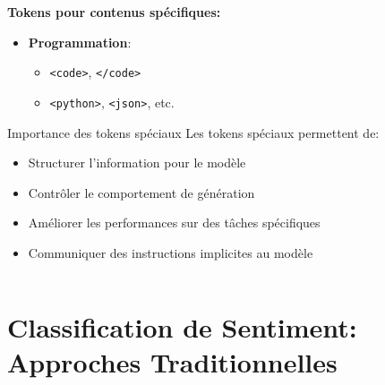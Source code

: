 \documentclass[aspectratio=169,11pt]{beamer}
\begin{document}
\begin{frame}
\begin{columns}[T]
        \begin{column}{0.5\textwidth}
            \textbf{Tokens pour contenus spécifiques:}
            \begin{itemize}
                \item \textbf{Programmation}:
                \begin{itemize}
                    \item \texttt{<code>}, \texttt{</code>}
                    \item \texttt{<python>}, \texttt{<json>}, etc.
                \end{itemize}
                \vspace{0.2cm}
            \end{itemize}
            
            \begin{alertblock}{Importance des tokens spéciaux}
                Les tokens spéciaux permettent de:
                \begin{itemize}
                    \item Structurer l'information pour le modèle
                    \item Contrôler le comportement de génération
                    \item Améliorer les performances sur des tâches spécifiques
                    \item Communiquer des instructions implicites au modèle
                \end{itemize}
            \end{alertblock}
        \end{column}
    \end{columns}
\end{frame}

\section{Classification de Sentiment: Approches Traditionnelles}
\end{document}
